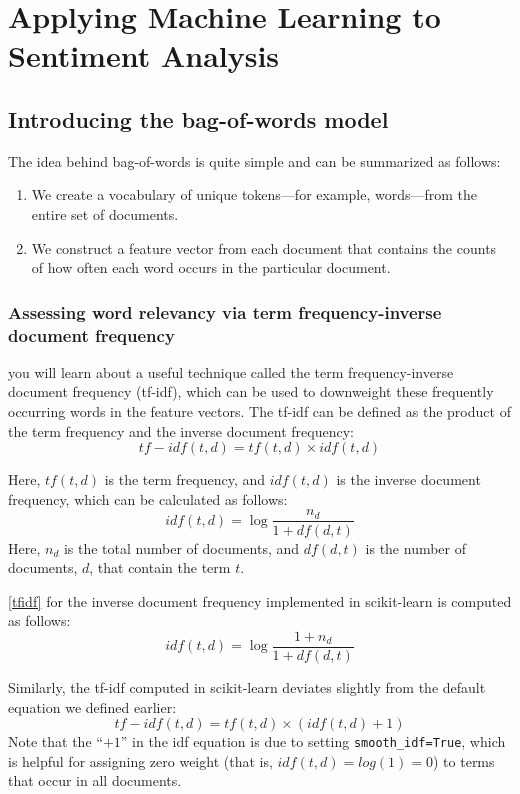 \chapter{Applying Machine Learning to Sentiment Analysis\label{Ch08}}
\section{Introducing the bag-of-words model}
The idea behind bag-of-words is quite simple and can be summarized as follows:
\begin{enumerate}
    \item We create a vocabulary of unique tokens—for example, words—from the entire set of documents.
    \item We construct a feature vector from each document that contains the counts of how often each word occurs in the particular document.
\end{enumerate}
\subsection{Assessing word relevancy via term frequency-inverse document frequency}
you will learn about a useful technique called the term frequency-inverse document frequency (tf-idf), which can be used to downweight these frequently occurring words in the feature vectors. The tf-idf can be defined as the product of the term frequency and the inverse document frequency:
$$tf-idf(t, d)=tf(t,d)\times idf(t, d)$$

Here, $tf(t, d)$ is the term frequency, and $idf(t, d)$ is the inverse
document frequency, which can be calculated as follows:
\begin{equation}
    \label{tfidf}
    idf(t, d)=\log\frac{n_d}{1+df(d, t)}
\end{equation}
Here, $n_d$ is the total number of documents, and $df(d, t)$ is the number of documents, $d$, that contain
the term $t$.

\autoref{tfidf} for the inverse document frequency implemented in scikit-learn is computed as follows:
\begin{equation}
    idf(t, d)=\log\frac{1+n_d}{1+df(d, t)}
\end{equation}

Similarly, the tf-idf computed in scikit-learn deviates slightly from the default equation we defined earlier:
$$tf-idf(t, d)=tf(t,d)\times (idf(t, d)+1)$$
Note that the “$+1$” in the idf equation is due to setting \verb|smooth_idf=True|, which is helpful for assigning zero weight (that is, $idf(t, d) = log(1) = 0$) to terms that occur in all documents.

